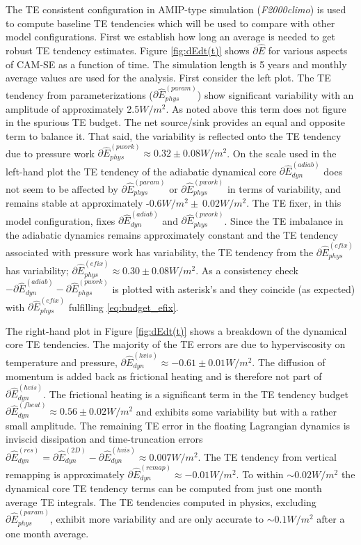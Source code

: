 \documentclass[draft,linenumbers]{agujournal}
\newcommand*{\gi}[1]{\widehat{#1}}
\begin{document}
The TE consistent configuration in AMIP-type simulation ({\em{F2000climo}}) is used to compute baseline TE tendencies which will be used to compare with other model configurations. First we establish how long an average is needed to get robust TE tendency estimates. Figure \ref{fig:dEdt(t)} shows $\partial \gi{E}$ for various aspects of CAM-SE as a function of time. The simulation length is 5 years and monthly average values are used for the analysis. First consider the left plot. The TE tendency from parameterizations ($\partial \gi{E}^{(param)}_{phys}$) show significant variability with an amplitude of approximately 2.5$W/m^2$. As noted above this term does not figure in the spurious TE budget. The net source/sink provides an equal and opposite term to balance it. That said, the variability is reflected onto the TE tendency due to pressure work {\color{red}{error}} $\partial \gi{E}^{(pwork)}_{phys}\approx 0.32\pm 0.08 W/m^2$. On the scale used in the left-hand plot the TE tendency of the adiabatic dynamical core $\partial \gi{E}^{(adiab)}_{dyn}$ does not seem to be affected by $\partial \gi{E}^{(param)}_{phys}$ or $\partial \gi{E}^{(pwork)}_{phys}$ in terms of variability, and remains stable at approximately -0.6$W/m^2\pm ~0.02 W/m^2$. The TE fixer, in this model configuration, fixes $\partial \gi{E}^{(adiab)}_{dyn}$ and $\partial \gi{E}^{(pwork)}_{phys}$. Since the TE imbalance in the adiabatic dynamics remains approximately constant and the TE tendency associated with pressure work {\color{red}{error}} has variability, the TE tendency from the $\partial \gi{E}^{(efix)}_{phys}$ has variability; $\partial \gi{E}^{(efix)}_{phys}\approx 0.30 \pm 0.08 W/m^2$. As a consistency check $-\partial \gi{E}^{(adiab)}_{dyn}-\partial \gi{E}^{(pwork)}_{phys}$ is plotted with asterisk's and they coincide (as expected) with $\partial \gi{E}^{(efix)}_{phys}$ fulfilling \eqref{eq:budget_efix}.

The right-hand plot in  Figure \ref{fig:dEdt(t)} shows a breakdown of the dynamical core TE tendencies. The majority of the TE errors are due to hyperviscosity on temperature and pressure, $\partial \gi{E}^{(hvis)}_{dyn}\approx -0.61\pm 0.01 W/m^2$. The diffusion of momentum is added back as frictional heating and is therefore not part of $\partial \gi{E}^{(hvis)}_{dyn}$. The frictional heating is a significant term in the TE tendency budget $\partial \gi{E}^{(fheat)}_{dyn}\approx 0.56\pm 0.02 W/m^2$ and exhibits some variability but with a rather small amplitude. The remaining TE error in the floating Lagrangian dynamics is inviscid dissipation and time-truncation errors $\partial \gi{E}_{dyn}^{(res)}=\partial \gi{E}_{dyn}^{({2D})}-\partial \gi{E}_{dyn}^{({hvis})}\approx 0.007 W/m^2$. The TE tendency from vertical remapping is approximately $\partial \gi{E}_{dyn}^{({remap})}\approx -0.01 W/m^2$. To within $\sim 0.02 W/m^2$ the dynamical core TE tendency terms can be computed from just one month average TE integrals. The TE tendencies computed in physics, excluding $\partial \gi{E}^{(param)}_{phys}$, exhibit more variability and are only accurate to $\sim 0.1 W/m^2$ after a one month average.
\end{document}
